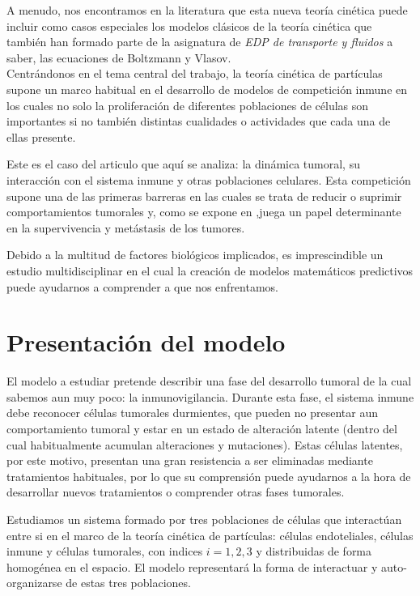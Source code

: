 \documentclass[1p]{elsarticle}
\begin{document}
A menudo, nos encontramos en la literatura\cite{libro} que esta nueva teoría cinética puede incluir como casos especiales los modelos clásicos de la teoría cinética que también han formado parte de la asignatura de \textit{EDP de transporte y fluidos} a saber, las ecuaciones de Boltzmann y Vlasov.\\

Centrándonos en el tema central del trabajo, la teoría cinética de partículas supone un marco habitual en el desarrollo de modelos de competición inmune en los cuales no solo la proliferación de diferentes poblaciones de células son importantes si no también distintas cualidades o actividades que cada una de ellas presente.

Este es el caso del articulo que aquí se analiza: la dinámica tumoral, su interacción con el sistema inmune y otras poblaciones celulares. Esta competición supone una de las primeras barreras en las cuales se trata de reducir o suprimir comportamientos tumorales y, como se expone en \cite{bibid},juega un papel determinante en la supervivencia y metástasis de los tumores.

Debido a la multitud de factores biológicos implicados, es imprescindible un estudio multidisciplinar en el cual la creación de modelos matemáticos predictivos puede ayudarnos a comprender a que nos enfrentamos.



\section{Presentación del modelo}
El modelo a estudiar pretende describir una fase del desarrollo tumoral de la cual sabemos aun muy poco: la inmunovigilancia. Durante esta fase, el sistema inmune debe reconocer células tumorales durmientes, que pueden no presentar aun comportamiento tumoral y estar en un estado de alteración latente (dentro del cual habitualmente acumulan alteraciones y mutaciones). Estas células latentes, por este motivo, presentan una gran resistencia a ser eliminadas mediante tratamientos habituales, por lo que su comprensión puede ayudarnos a la hora de desarrollar nuevos tratamientos o comprender otras fases tumorales. 

Estudiamos un sistema formado por tres poblaciones de células que interactúan entre si en el marco de la teoría cinética de partículas: células endoteliales, células inmune y células tumorales, con indices $i=1,2,3$ y distribuidas de forma homogénea en el espacio. El modelo representará la forma de interactuar y auto-organizarse de estas tres poblaciones.
\end{document}
